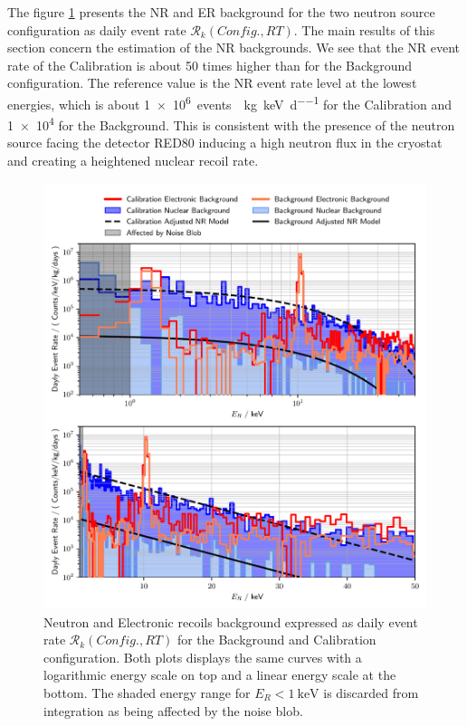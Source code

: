 The figure \ref{fig:background-measurements} presents the NR and ER background for the two neutron source configuration as daily event rate $\mathcal{R}_k(Config., RT)$. The main results of this section concern the estimation of the NR backgrounds. We see that the NR event rate of the Calibration is about 50 times higher than for the Background configuration. The reference value is the NR event rate level at the lowest energies, which is about \SI{1e6}{events \per \kg \per \kilo\eV \per \day} for the Calibration and \num{1e4} for the Background. This is consistent with the presence of the neutron source facing the detector RED80 inducing a high neutron flux in the cryostat and creating a heightened nuclear recoil rate. 

\begin{figure}
\centering
\includegraphics[scale=1]{Figures/Neutron/neutron_background.pdf}
\caption{Neutron and Electronic recoils background expressed as daily event rate $\mathcal{R}_k(Config., RT)$ for the Background and Calibration configuration. Both plots displays the same curves with a logarithmic energy scale on top and a linear energy scale at the bottom. The shaded energy range for $E_R< \SI{1}{\kilo\eV}$ is discarded from integration as being affected by the noise blob.}
\label{fig:background-measurements}
\end{figure}

